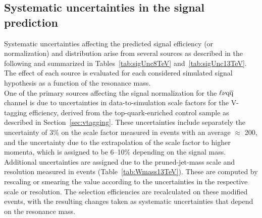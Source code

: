 \subsection{Systematic uncertainties in the signal prediction}\label{subsec:uncSig}

Systematic uncertainties affecting the predicted signal efficiency (or normalization) and \mlvj distribution arise from several sources as described in the following and summarized in Tables~\ref{tab:sigUnc8TeV} and~\ref{tab:sigUnc13TeV}.
The effect of each source is evaluated for each considered simulated signal hypothesis as a function of the resonance mass.\\

One of the primary sources affecting the signal normalization for the $\ell\nu\mathrm{q}\overline{\mathrm{q}}$ channel is due to uncertainties in data-to-simulation scale factors for the V-tagging efficiency, derived from the top-quark-enriched control sample as described in Section~\ref{sec:vtagging}. These uncertainties include separately the uncertainty of 3\% on the scale factor measured in \ttbar events with an average \pt $\approx$ 200\GeV, and the uncertainty due to the extrapolation of the scale factor to higher momenta, which is assigned to be 6--10\% depending on the signal mass. Additional uncertainties are assigned due to the pruned-jet-mass scale and resolution measured in \ttbar events (Table~\ref{tab:Wmass13TeV}). These are computed by rescaling or smearing the \mJ value according to the uncertainties in the respective \mJ scale or resolution. The selection efficiencies are recalculated on these modified events, with the resulting changes taken as systematic uncertainties that depend on the resonance mass.

